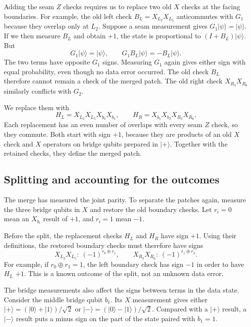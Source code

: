 \documentclass[11pt,a4paper]{article}
\newcommand{\ket}[1]{\lvert #1\rangle}
\begin{document}
Adding the seam $Z$ checks requires us to replace two old $X$ checks at the facing boundaries. For example, the old left check $B_L=X_{L_2}X_{L_5}$ anticommutes with $G_1$ because they overlap only at $L_2$. Suppose a seam measurement gives $G_1\ket{\psi}=\ket{\psi}$. If we then measure $B_L$ and obtain $+1$, the state is proportional to $(I+B_L)\ket{\psi}$. But
\[
G_1\ket{\psi}=\ket{\psi},
\qquad
G_1B_L\ket{\psi}=-B_L\ket{\psi}.
\]
The two terms have opposite $G_1$ signs. Measuring $G_1$ again gives either sign with equal probability, even though no data error occurred. The old check $B_L$ therefore cannot remain a check of the merged patch. The old right check $X_{R_3}X_{R_6}$ similarly conflicts with $G_2$.

We replace them with
\[
H_L=X_{L_2}X_{L_5}X_{b_0}X_{b_1},
\qquad
H_R=X_{b_1}X_{b_2}X_{R_3}X_{R_6}.
\]
Each replacement has an even number of overlaps with
every seam $Z$ check, so they commute. Both start with
sign $+1$, because they are products of an old $X$
check and $X$ operators on bridge qubits prepared in
$\ket{+}$. Together with the retained checks, they
define the merged patch.

\subsection{Splitting and accounting for the outcomes}

The merge has measured the joint parity. To separate the patches again, measure the three bridge qubits in $X$ and restore the old boundary checks. Let $r_i=0$ mean an $X_{b_i}$ result of $+1$, and $r_i=1$ mean $-1$.

Before the split, the replacement checks $H_L$ and $H_R$ have sign $+1$. Using their definitions, the restored boundary checks must therefore have signs
\[
X_{L_2}X_{L_5}:\ (-1)^{r_0\oplus r_1},
\qquad
X_{R_3}X_{R_6}:\ (-1)^{r_1\oplus r_2}.
\]
For example, if $r_0\oplus r_1=1$, the left boundary check has sign $-1$ in order to have $H_L$ $+1$. This is a known outcome of the
split, not an unknown data error.

The bridge measurements also affect the signs between terms in the data state. Consider the middle bridge qubit $b_1$.
Its $X$ measurement gives either
$\ket{+}=(\ket0+\ket1)/\sqrt2$ or $\ket{-}=(\ket0-\ket1)/\sqrt2$.
Compared with a $\ket{+}$ result, a $\ket{-}$ result puts a minus sign on the part of the state paired with $b_1=1$.
\end{document}
